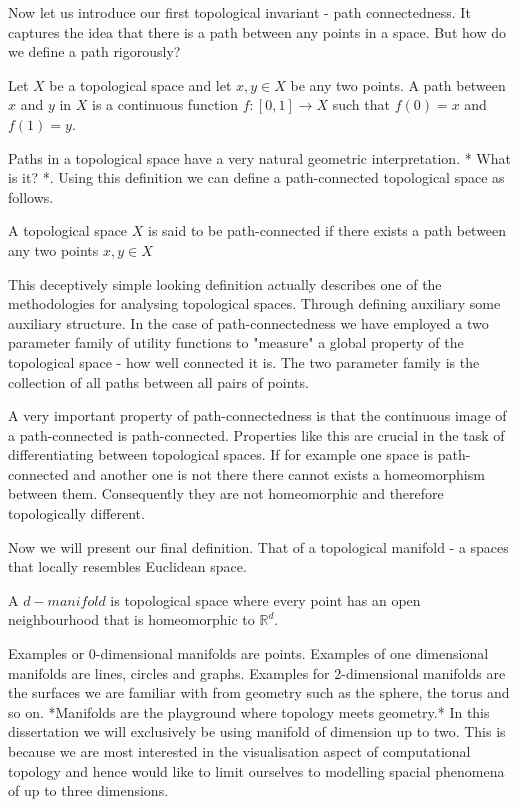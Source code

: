 
Now let us introduce our first topological invariant - path connectedness. It captures the idea that there is a path between any points in a space. But how do we define a path rigorously?

\begin{defn} Let $X$ be a topological space and let $x, y \in X$ be any two points. A path between $x$ and $y$ in $X$ is a continuous function $f: [0, 1] \to X$ such that $f(0) = x$ and $f(1) = y$.  \end{defn}


Paths in a topological space have a very natural geometric interpretation. * What is it? *. Using this definition we can define a path-connected topological space as follows.

\begin{defn} A topological space $X$ is said to be path-connected if there exists a path between any two points $x, y \in X$  \end{defn}

This deceptively simple looking definition actually describes one of the methodologies for analysing topological spaces. Through defining auxiliary some auxiliary structure. In the case of path-connectedness we have employed a two parameter family of utility functions to "measure" a global property of the topological space - how well connected it is. The two parameter family is the collection of all paths between all pairs of points.

A very important property of path-connectedness is that the continuous image of a path-connected is path-connected. Properties like this are crucial in the task of differentiating between topological spaces. If for example one space is path-connected and another one is not there there cannot exists a homeomorphism between them. Consequently they are not homeomorphic and therefore topologically different.

Now we will present our final definition. That of a topological manifold - a spaces that locally resembles Euclidean space.

\begin{defn} A $d-manifold$ is topological space where every point has an open neighbourhood that is homeomorphic to $\mathbb{R}^d$.  \end{defn}

Examples or 0-dimensional manifolds are points. Examples of one dimensional manifolds are lines, circles and graphs. Examples for 2-dimensional manifolds are the surfaces we are familiar with from geometry such as the sphere, the torus and so on. *Manifolds are the playground where topology meets geometry.* In this dissertation we will exclusively be using manifold of dimension up to two. This is because we are most interested in the visualisation aspect of computational topology and hence would like to limit ourselves to modelling spacial phenomena of up to three dimensions.

